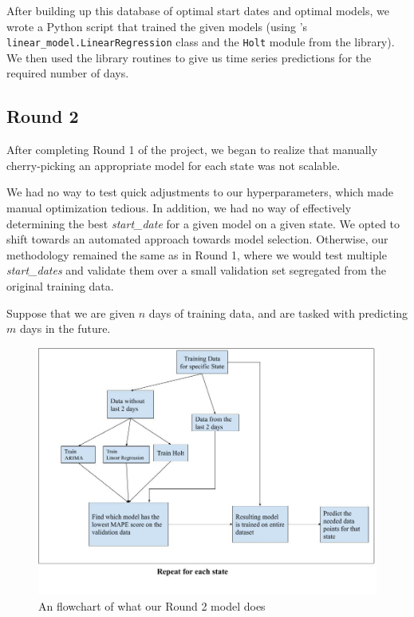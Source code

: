 \documentclass[sigconf,nonacm]{acmart}
\begin{document}
After building up this database of optimal start dates and optimal models, we
wrote a Python script that trained the given models (using \cite{scikit-learn}'s
\texttt{linear\_model.LinearRegression} class and the \texttt{Holt} module from
the \cite{statsmodels} library). We then used the library routines to give us
time series predictions for the required number of days. 

\subsection{Round 2}

After completing Round 1 of the project, we began to realize that manually
cherry-picking an appropriate model for each state was not scalable. 

We had no way to test quick adjustments to our hyperparameters, which made
manual optimization tedious. In addition, we had no way of effectively
determining the best \emph{start\_date} for a given model on a given state. 
We opted to shift towards an automated approach towards model selection. 
Otherwise, our methodology remained the same as in Round 1, where we would test
multiple \emph{start\_dates} and validate them over a small validation set
segregated from the original training data.

Suppose that we are given $n$ days of training data, and are tasked with
predicting $m$ days in the future. 

\begin{figure}
  \centering
  \includegraphics[width=\linewidth]{figures/Final_model.jpg}
  \caption{An flowchart of what our Round 2 model does}
  \label{fig:model_final}
\end{figure}
\end{document}
